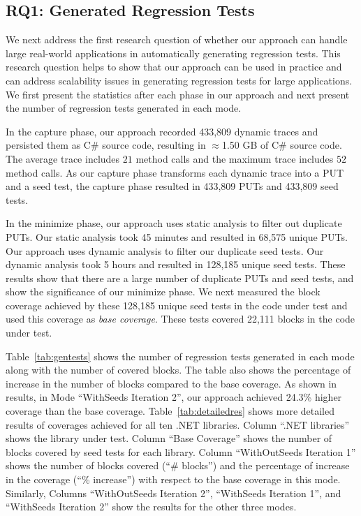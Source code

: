 \subsection{RQ1: Generated Regression Tests}

We next address the first research question of whether our approach can handle large real-world applications in automatically generating regression tests. This research question helps to show that our approach can be used in practice and can address scalability issues in generating regression tests for large applications. We first present the statistics after each phase in our approach and next present the number of regression tests generated in each mode.

In the capture phase, our approach recorded 433,809 dynamic traces and persisted them as C\# source code, resulting in $\approx$1.50 GB of C\# source code. The average trace includes $21$ method calls and the maximum trace includes $52$ method calls. As our capture phase transforms each dynamic trace into a PUT and a seed test, the capture phase resulted in 433,809 PUTs and 433,809 seed tests. 

In the minimize phase, our approach uses static analysis to filter out duplicate PUTs. Our static analysis took 45 minutes and resulted in 68,575 unique PUTs. Our approach uses dynamic analysis to filter our duplicate seed tests. Our dynamic analysis took 5 hours and resulted in 128,185 unique seed tests. These results show that there are a large number of duplicate PUTs and seed tests, and show the significance of our minimize phase. We next measured the block coverage achieved by these 128,185 unique seed tests in the code under test and used this coverage as \emph{base coverage}. These tests covered 22,111 blocks in the code under test. 

Table~\ref{tab:gentests} shows the number of regression tests generated in each mode along with the number of covered blocks. The table also shows the percentage of increase
in the number of blocks compared to the base coverage. As shown in results, in Mode ``WithSeeds Iteration 2'', our approach achieved 24.3\% higher coverage than the base coverage. Table~\ref{tab:detailedres} shows more detailed results of coverages achieved for all ten .NET libraries. Column ``.NET libraries'' shows the library under test. Column ``Base Coverage'' shows the number of blocks covered by seed tests for each library. Column ``WithOutSeeds Iteration 1'' shows the number of blocks covered (``\# blocks'') and the percentage of increase in the coverage (``\% increase'') with respect to the base coverage in this mode. Similarly, Columns ``WithOutSeeds Iteration 2'', ``WithSeeds Iteration 1'', and ``WithSeeds Iteration 2'' show the results for the other three modes. 


